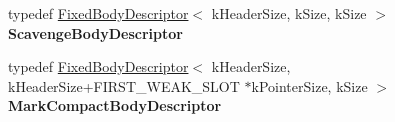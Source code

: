 \begin{DoxyCompactItemize}
\item 
typedef \hyperlink{classv8_1_1internal_1_1_fixed_body_descriptor}{Fixed\+Body\+Descriptor}$<$ k\+Header\+Size, k\+Size, k\+Size $>$ {\bfseries Scavenge\+Body\+Descriptor}\hypertarget{classv8_1_1internal_1_1_context_a5ac8f9571a52ad9278ddfdf3d1eb6dc4}{}\label{classv8_1_1internal_1_1_context_a5ac8f9571a52ad9278ddfdf3d1eb6dc4}

\item 
typedef \hyperlink{classv8_1_1internal_1_1_fixed_body_descriptor}{Fixed\+Body\+Descriptor}$<$ k\+Header\+Size, k\+Header\+Size+F\+I\+R\+S\+T\+\_\+\+W\+E\+A\+K\+\_\+\+S\+L\+OT $\ast$k\+Pointer\+Size, k\+Size $>$ {\bfseries Mark\+Compact\+Body\+Descriptor}\hypertarget{classv8_1_1internal_1_1_context_add51c233d5f787faaf5bc97e861db07e}{}\label{classv8_1_1internal_1_1_context_add51c233d5f787faaf5bc97e861db07e}

\end{DoxyCompactItemize}
